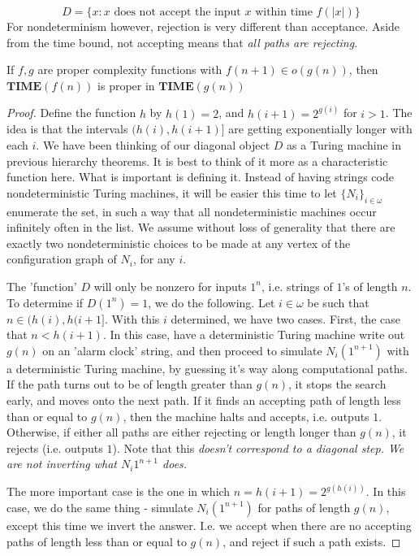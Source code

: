 \[ D = \{x: \textrm{$x$ does not accept the input $x$ within time $f(|x|)$}\} \]
For nondeterminism however, rejection is very different than acceptance. Aside from the time bound, not accepting means that \textit{all paths are rejecting}.
\begin{theorem}
	If $f,g$ are proper complexity functions with $f(n+1) \in o(g(n))$, then $\textbf{TIME}(f(n))$ is proper in $\textbf{TIME}(g(n))$
\end{theorem}
\begin{proof}
	Define the function $h$ by $h(1)=2$, and $h(i+1) = 2^{g(i)}$ for $i > 1$. The idea is that the intervals $(h(i),h(i+1)]$ are getting exponentially longer with each $i$. We have been thinking of our diagonal object $D$ as a Turing machine in previous hierarchy theorems. It is best to think of it more as a characteristic function here. What is important is defining it. Instead of having strings code nondeterministic Turing machines, it will be easier this time to let $\{N_i\}_{i \in \omega}$ enumerate the set, in such a way that all nondeterministic machines occur infinitely often in the list. We assume without loss of generality that there are exactly two nondeterministic choices to be made at any vertex of the configuration graph of $N_i$, for any $i$.
	\par The 'function' $D$ will only be nonzero for inputs $1^n$, i.e. strings of $1$'s of length $n$. To determine if $D(1^n)=1$, we do the following. Let $i \in \omega$ be such that $n \in (h(i),h(i+1]$. With this $i$ determined, we have two cases. First, the case that $n < h(i+1)$. In this case, have a deterministic Turing machine write out $g(n)$ on an 'alarm clock' string, and then proceed to simulate $N_i(1^{n+1})$ with a deterministic Turing machine, by guessing it's way along computational paths. If the path turns out to be of length greater than $g(n)$, it stops the search early, and moves onto the next path. If it finds an accepting path of length less than or equal to $g(n)$, then the machine halts and accepts, i.e. outputs $1$. Otherwise, if either all paths are either rejecting or length longer than $g(n)$, it rejects (i.e. outputs $1$). Note that this \textit{doesn't correspond to a diagonal step. We are not inverting what $N_i{1^{n+1}}$ does.}
	\par The more important case is the one in which $n = h(i+1) = 2^{g(h(i))}$. In this case, we do the same thing - simulate $N_i(1^{n+1})$ for paths of length $g(n)$, except this time we invert the answer. I.e. we accept when there are no accepting paths of length less than or equal to $g(n)$, and reject if such a path exists. 
\end{proof}

